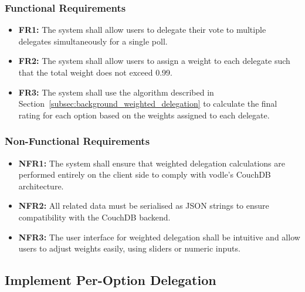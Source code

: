 \subsubsection{Functional Requirements}
\begin{itemize}
    \item \textbf{FR1:} The system shall allow users to delegate their vote to multiple delegates simultaneously for a single poll.

    \item \textbf{FR2:} The system shall allow users to assign a weight to each delegate such that the total weight does not exceed 0.99.

    \item \textbf{FR3:} The system shall use the algorithm described in Section~\ref{subsec:background_weighted_delegation} to calculate the final rating for each option based on the weights assigned to each delegate.
\end{itemize}

\subsubsection{Non-Functional Requirements}
\begin{itemize}
    \item \textbf{NFR1:} The system shall ensure that weighted delegation calculations are performed entirely on the client side to comply with vodle's CouchDB architecture.

    \item \textbf{NFR2:} All related data must be serialised as JSON strings to ensure compatibility with the CouchDB backend.

    \item \textbf{NFR3:} The user interface for weighted delegation shall be intuitive and allow users to adjust weights easily, using sliders or numeric inputs.
\end{itemize}
\subsection{Implement Per-Option Delegation}\label{subsec:requirements_option}
